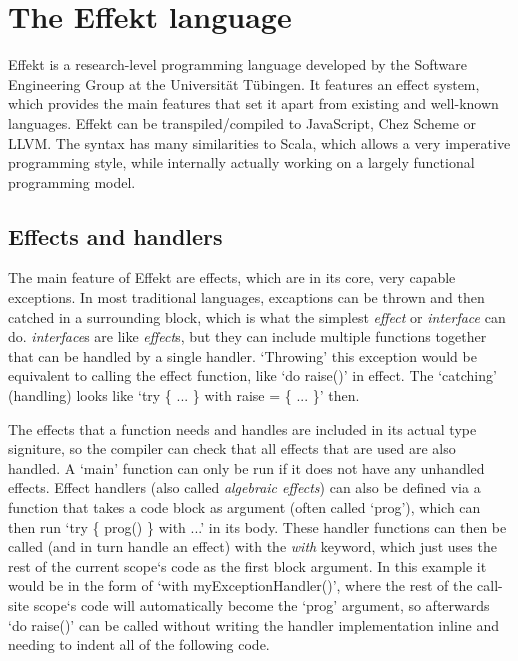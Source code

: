 \chapter{The Effekt language}\label{chap:effekt}

Effekt is a research-level programming language developed by the Software Engineering Group at the Universität Tübingen. It features an effect system, which provides the main features that set it apart from existing and well-known languages. Effekt can be transpiled/compiled to JavaScript, Chez Scheme or LLVM. The syntax has many similarities to Scala, which allows a very imperative programming style, while internally actually working on a largely functional programming model.

\section{Effects and handlers}

The main feature of Effekt are effects, which are in its core, very capable exceptions. In most traditional languages, excaptions can be thrown and then catched in a surrounding block, which is what the simplest \textit{effect} or \textit{interface} can do. \textit{interface}s are like \textit{effect}s, but they can include multiple functions together that can be handled by a single handler. `Throwing' this exception would be equivalent to calling the effect function, like `do raise()' in effect. The `catching' (handling) looks like `try \{ ... \} with raise = \{ ... \}' then.

The effects that a function needs and handles are included in its actual type signiture, so the compiler can check that all effects that are used are also handled. A `main' function can only be run if it does not have any unhandled effects. Effect handlers (also called \textit{algebraic effects}) can also be defined via a function that takes a code block as argument (often called `prog'), which can then run `try \{ prog() \} with ...' in its body. These handler functions can then be called (and in turn handle an effect) with the \textit{with} keyword, which just uses the rest of the current scope`s code as the first block argument. In this example it would be in the form of `with myExceptionHandler()', where the rest of the call-site scope`s code will automatically become the `prog' argument, so afterwards `do raise()' can be called without writing the handler implementation inline and needing to indent all of the following code.

